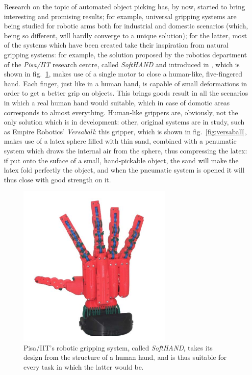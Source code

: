 Research on the topic of automated object picking has, by now, started
to bring interesting and promising results; for example, universal gripping systems
are being studied for robotic arms both for industrial and domestic
scenarios (which, being so different, will hardly converge to a unique
solution); for the latter, most of the systems which have been created
take their inspiration from natural gripping systems: for example, the
solution proposed by the
robotics department of the \emph{Pisa/IIT} research centre, called
\emph{SoftHAND} and introduced in \cite{pisa-softhand}, which is shown in fig.~\ref{fig:pisa-softhand}, makes
use of a single motor to close a human-like, five-fingered hand. Each
finger, just like in a human hand, is capable of small deformations in
order to get a better grip on objects. This brings goods result in
all the scenarios in which a real human hand would suitable, which in
case of domotic areas corresponds to almost everything. Human-like
grippers are, obviously, not the only solution which is in
development: other, original systems are in study, such as Empire
Robotics' \emph{Versaball}: this gripper, which is shown in
fig.~\ref{fig:versaball}, makes use of a latex sphere filled with thin
sand, combined with a penumatic system which draws the internal air
from the sphere, thus compressing the latex: if put onto the suface of
a small, hand-pickable object, the sand will make the latex fold
perfectly the object, and when the pneumatic system is opened it will
thus close with good strength on it.

\begin{figure}[htbp]
\centering
\includegraphics[width=3in]{./Graphics/pisa-softhand}
\caption{Pisa/IIT's robotic gripping system, called \emph{SoftHAND},
  takes its design from the structure of a human hand, and is thus
  suitable for every task in which the latter would be.\label{fig:pisa-softhand}}
\end{figure}

